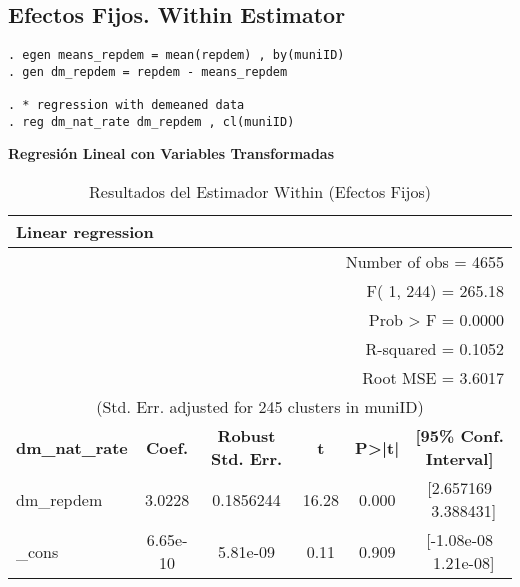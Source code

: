 \documentclass[12pt]{article}
\begin{document}
\subsection*{\noindent\textbf{Efectos Fijos. Within Estimator}}

\begin{verbatim}
. egen means_repdem = mean(repdem) , by(muniID)
. gen dm_repdem = repdem - means_repdem

. * regression with demeaned data
. reg dm_nat_rate dm_repdem , cl(muniID)
\end{verbatim}

\begin{center}
    \textbf{Regresión Lineal con Variables Transformadas}
\end{center}

\begin{table}[H] %
    \centering
    \caption{Resultados del Estimador Within (Efectos Fijos)}
    \begin{tabular}{l c c c c c}
        \multicolumn{6}{l}{\textbf{Linear regression}} \\
        \hline
        \multicolumn{3}{l}{} & \multicolumn{3}{r}{Number of obs = 4655} \\
        \multicolumn{3}{l}{} & \multicolumn{3}{r}{F( 1, 244) = 265.18} \\
        \multicolumn{3}{l}{} & \multicolumn{3}{r}{Prob > F = 0.0000} \\
        \multicolumn{3}{l}{} & \multicolumn{3}{r}{R-squared = 0.1052} \\
        \multicolumn{3}{l}{} & \multicolumn{3}{r}{Root MSE = 3.6017} \\
        \hline
        \multicolumn{6}{c}{(Std. Err. adjusted for 245 clusters in muniID)} \\
        \hline
        \textbf{dm\_nat\_rate} & \textbf{Coef.} & \textbf{Robust Std. Err.} & \textbf{t} & \textbf{P>|t|} & \textbf{[95\% Conf. Interval]} \\
        \hline
        dm\_repdem & 3.0228 & 0.1856244 & 16.28 & 0.000 & [2.657169 \ 3.388431] \\
        \_cons & 6.65e-10 & 5.81e-09 & 0.11 & 0.909 & [-1.08e-08 \ 1.21e-08] \\
        \hline
    \end{tabular}
\end{table}
\end{document}
